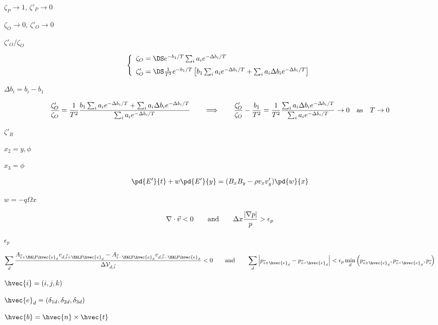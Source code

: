\documentclass{article}
\begin{document}
$ \zeta_P \to 1,
\, \zeta'_P \to 0$
\pagebreak

$\zeta_O\to 0,\,\zeta'_O\to0$
\pagebreak

$ \zeta'_O/\zeta_O$
\pagebreak

\[  \left\{\begin{array}{l}
    \zeta_O  = \DS e^{-b_1/T}\sum_i a_ie^{-\Delta b_i/T} \\ \noalign{\medskip}
    \zeta'_O = \DS \frac{1}{T^2}e^{-b_1/T}
                 \left[ b_1 \sum_i a_ie^{-\Delta b_i/T} 
                           +\sum_i a_i\Delta b_ie^{-\Delta b_i/T}\right]
  \end{array}\right.
\]
\pagebreak

$\Delta b_i = b_i-b_1$
\pagebreak

\[  \frac{\zeta'_O}{\zeta_O} = \frac{1}{T^2}
    \frac{   b_1 \sum_i a_ie^{-\Delta b_i/T} 
          + \sum_i a_i\Delta b_ie^{-\Delta b_i/T}}
         {\sum_i a_ie^{-\Delta b_i/T}}
   \qquad\Longrightarrow\qquad
  \frac{\zeta'_O}{\zeta_O} - \frac{b_1}{T^2}= \frac{1}{T^2}
    \frac{\sum_i a_i\Delta b_ie^{-\Delta b_i/T}}
         {\sum_i a_ie^{-\Delta b_i/T}}  \to 0 \quad{\rm as}\quad T\to 0
\]
\pagebreak

$\zeta'_R$
\pagebreak

$ x_2=y,\phi$
\pagebreak

$ x_3 = \phi$
\pagebreak

\[   \pd{E'}{t} + w\pd{E'}{y} = (B_xB_y - \rho v_xv'_y)\pd{w}{x}
\]
\pagebreak

$w = -q\Omega x$
\pagebreak

\[   \nabla\cdot\vec{v} < 0 \qquad{\rm and}\qquad
   \Delta x\frac{|\nabla p|}{p} > \epsilon_p
\]
\pagebreak

$\epsilon_p$
\pagebreak

\[  \sum_d \frac{ A_{\vec{i}+\HALF\hvec{e}_d}v_{d,\vec{i}+\HALF\hvec{e}_d}
               -A_{\vec{i}-\HALF\hvec{e}_d}v_{d,\vec{i}-\HALF\hvec{e}_d} }
              {\Delta{\cal V}_{d,\vec{i}}}  < 0
              \qquad{\rm and}\qquad
  \sum_{d} \left|p_{\vec{i}+\hvec{e}_d} - p_{\vec{i}-\hvec{e}_d}\right|
           <
   \epsilon_p \min_d\left(p_{\vec{i}+\hvec{e}_d},
                          p_{\vec{i}-\hvec{e}_d},p_{\vec{i}}\right)
\]
\pagebreak

$\hvec{i} = (i,j,k)$
\pagebreak

$\hvec{e}_d =
(\delta_{1d},\delta_{2d},\delta_{3d})$
\pagebreak

$ \hvec{b} = \hvec{n} \times \hvec{t} $
\pagebreak
\end{document}
